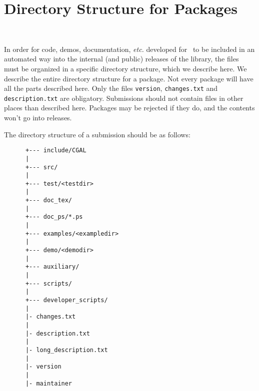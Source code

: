 
\chapter{Directory Structure for Packages}
\label{chap:directory_structure}
 \\

In order for code, demos, documentation, {\em etc.} developed for \cgal\ to 
be included in an automated way into the internal (and public) releases of the 
library, the files must be organized in a specific directory structure, which 
we describe here.  We describe the entire directory structure for a package. 
Not every package will have all the parts described here. Only the files
{\tt version}, {\tt changes.txt} and {\tt description.txt} are obligatory.
Submissions should not contain files in other places than described here.
Packages may be rejected if they do, and the contents won't go into releases.

The directory structure of a submission should be as follows: 

\begin{verbatim}
      +--- include/CGAL
      |
      +--- src/
      |
      +--- test/<testdir>
      |
      +--- doc_tex/
      |
      +--- doc_ps/*.ps
      |
      +--- examples/<exampledir>
      |
      +--- demo/<demodir>
      |
      +--- auxiliary/
      |
      +--- scripts/
      |
      +--- developer_scripts/
      |
      |- changes.txt
      |
      |- description.txt
      |
      |- long_description.txt
      |
      |- version
      |
      |- maintainer
\end{verbatim}


